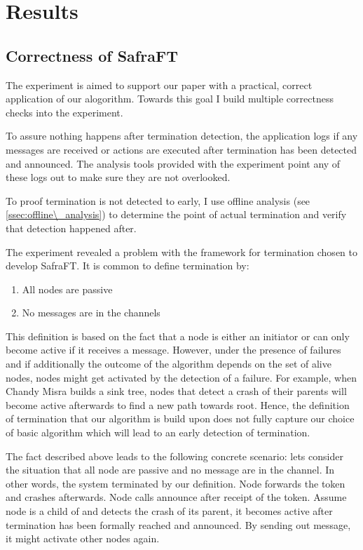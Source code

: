 \section{Results}
\label{sec:results}

\subsection{Correctness of SafraFT}
The experiment is aimed to support our paper with a practical, correct application of our alogorithm.
Towards this goal I build multiple correctness checks into the experiment. 


To assure nothing happens after termination detection, the application logs if any messages are received or actions are executed after termination has been detected and announced. 
The analysis tools provided with the experiment point any of these logs out to make sure they are not overlooked.

To proof termination is not detected to early, I use offline analysis (see \cref{ssec:offline\_analysis}) to determine the point of actual termination and verify that detection happened after.

The experiment revealed a problem with the framework for termination chosen to develop SafraFT.
It is common to define termination by:
\begin{enumerate}
	\item All nodes are passive
	\item No messages are in the channels
\end{enumerate}
This definition is based on the fact that a node is either an initiator or can only become active if it receives a message. 
However, under the presence of failures and if additionally the outcome of the algorithm depends on the set of alive nodes, nodes might get activated by the detection of a failure.
For example, when Chandy Misra builds a sink tree, nodes that detect a crash of their parents will become active afterwards to find a new path towards root.
Hence, the definition of termination that our algorithm is build upon does not fully capture our choice of basic algorithm which will lead to an early detection of termination.

The fact described above leads to the following concrete scenario: lets consider the situation that all node are passive and no message are in the channel. 
In other words, the system terminated by our definition.
Node  forwards the token and crashes afterwards. 
Node  calls announce after receipt of the token.
Assume node  is a child of  and detects the crash of its parent, it becomes active after termination has been formally reached and announced.
By sending out  message, it might activate other nodes again.

